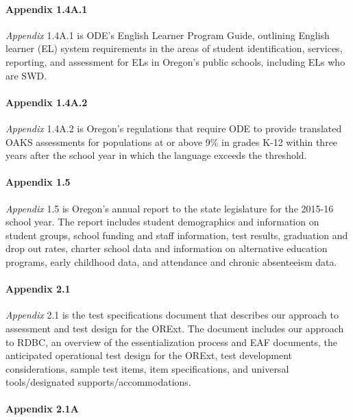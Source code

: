\documentclass[]{article}
\let\oldparagraph\paragraph
\renewcommand{\paragraph}[1]{\oldparagraph{#1}\mbox{}}
\begin{document}
\paragraph{Appendix 1.4A.1}\label{appendix-1.4a.1}

\emph{Appendix} 1.4A.1 is ODE's English Learner Program Guide, outlining
English learner (EL) system requirements in the areas of student
identification, services, reporting, and assessment for ELs in Oregon's
public schools, including ELs who are SWD.

\paragraph{Appendix 1.4A.2}\label{appendix-1.4a.2}

\emph{Appendix} 1.4A.2 is Oregon's regulations that require ODE to
provide translated OAKS assessments for populations at or above 9\% in
grades K-12 within three years after the school year in which the
language exceeds the threshold.

\paragraph{Appendix 1.5}\label{appendix-1.5}

\emph{Appendix} 1.5 is Oregon's annual report to the state legislature
for the 2015-16 school year. The report includes student demographics
and information on student groups, school funding and staff information,
test results, graduation and drop out rates, charter school data and
information on alternative education programs, early childhood data, and
attendance and chronic absenteeism data.

\paragraph{Appendix 2.1}\label{appendix-2.1}

\emph{Appendix} 2.1 is the test specifications document that describes
our approach to assessment and test design for the ORExt. The document
includes our approach to RDBC, an overview of the essentialization
process and EAF documents, the anticipated operational test design for
the ORExt, test development considerations, sample test items, item
specifications, and universal tools/designated supports/accommodations.

\paragraph{Appendix 2.1A}\label{appendix-2.1a}
\end{document}
